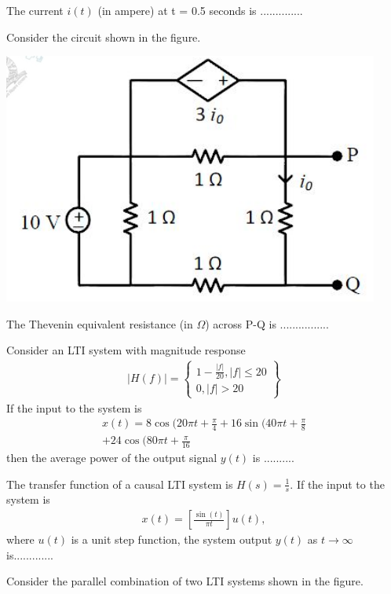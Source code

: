 The current $i(t)$ (in ampere) at t = 0.5 seconds is ..............

\item Consider the circuit shown in the figure.

\includegraphics[scale=0.3]{32}

The Thevenin equivalent resistance (in $\Omega$) across P-Q is ................

\item Consider an LTI system with magnitude response
\begin{align*}
|H(f)| = 
\left\lbrace
\begin{array}{ll}
      1 - \frac{|f|}{20}, |f| \leq 20\\
      0, |f| > 20
\end{array}
\right\rbrace
\end{align*}
If the input to the system is 
\begin{align*}
x(t)=8\cos (20 \pi t + \frac{\pi}{4} + 16\sin(40 \pi t + \frac{\pi}{8} \\+ 24\cos(80 \pi t + \frac{\pi}{16}
\end{align*}
then the average power of the output signal $y(t)$ is ..........

\item The transfer function of a causal LTI system is $H(s)=\frac{1}{s}$. If the input to the system is 
\begin{align*}
x(t) = [\frac{\sin(t)}{\pi t}]u(t),
\end{align*}
where $u(t)$ is a unit step function, the system output $y(t)$ as $t \to \infty$ is.............

\item Consider the parallel combination of two LTI systems shown in the figure.

